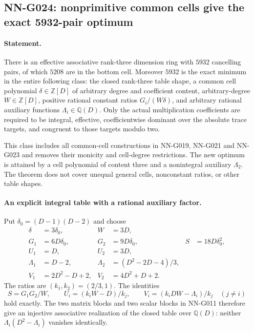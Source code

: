 \subsection{NN-G024: nonprimitive common cells give the exact 5932-pair optimum}
\paragraph{Statement.}
There is an effective associative rank-three dimension ring with
$5932$ cancelling pairs, of which $5208$ are in the bottom cell.
Moreover $5932$ is the exact minimum in the entire following
class: the closed rank-three table shape, a common cell polynomial
$\delta\in\mathbb Z[D]$ of arbitrary degree and coefficient content,
arbitrary-degree $W\in\mathbb Z[D]$, positive rational constant
ratios $G_i/(W\delta)$, and arbitrary rational auxiliary functions
$\Lambda_i\in\mathbb Q(D)$. Only the actual multiplication
coefficients are required to be integral, effective, coefficientwise
dominant over the absolute trace targets, and congruent to those
targets modulo two.

This class includes all common-cell constructions in NN-G019,
NN-G021 and NN-G023 and removes their monicity and cell-degree
restrictions. The new optimum is attained by a cell polynomial
of content three and a nonintegral auxiliary $\Lambda_2$.
The theorem does not cover unequal general cells, nonconstant
ratios, or other table shapes.

\paragraph{An explicit integral table with a rational auxiliary factor.}
Put $\delta_0=(D-1)(D-2)$ and choose
\[
 \begin{aligned}
 \delta&=3\delta_0,& W&=3D,\\
 G_1&=6D\delta_0,&G_2&=9D\delta_0,&S&=18D\delta_0^2,\\
 U_1&=D,&U_2&=3D,\\
 \Lambda_1&=D-2,&\Lambda_2&=(D^2-2D-4)/3,\\
 V_1&=2D^2-D+2,&V_2&=4D^2+D+2.
 \end{aligned}                                                   \tag{G024.1}
\]
The ratios are $(k_1,k_2)=(2/3,1)$. The identities
\[
 S=G_1G_2/W,\qquad
 U_i=(k_iW-D)/k_j,\qquad
 V_i=(k_iDW-\Lambda_i)/k_j\quad(j\ne i)
\]
hold exactly. The two matrix blocks and two scalar blocks in
NN-G011 therefore give an injective associative realization
of the closed table over $\mathbb Q(D)$: neither
$\Lambda_i(D^2-\Lambda_i)$ vanishes identically.

